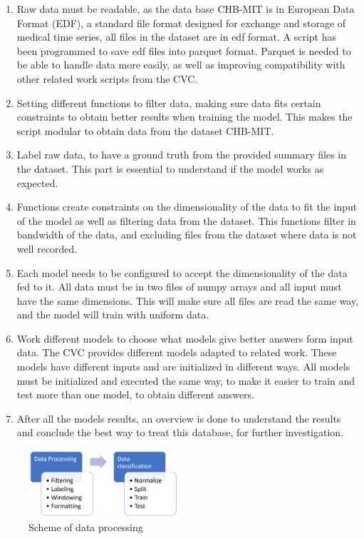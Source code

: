 \begin{enumerate}

\item Raw data must be readable, as the data base CHB-MIT is in European Data Format (EDF), a standard file format designed for exchange and storage of medical time series, all files in the dataset are in edf format. A script has been programmed to save edf files into parquet format. Parquet is needed to be able to handle data more easily, as well as improving compatibility with other related work scripts from the CVC.
\item Setting different functions to filter data, making sure data fits certain constraints to obtain better results when training the model. This makes the script modular to obtain data from the dataset CHB-MIT.
\item Label raw data, to have a ground truth from the provided summary files in the dataset.  This part is essential to understand if the model works as expected.
\item Functions create constraints on the dimensionality of the data to fit the input of the model as well as filtering data from the dataset. This functions filter in bandwidth of the data, and excluding files from the dataset where data is not well recorded.
\item Each model needs to be configured to accept the dimensionality of the data fed to it. All data must be in two files of numpy arrays and all input must have the same dimensions. This will make sure all files are read the same way, and the model will train with uniform data.
\item Work different models to choose what models give better answers form input data. The CVC provides different models adapted to related work. These models have different inputs and are initialized in different ways. All models must be initialized and executed the same way, to make it easier to train and test more than one model, to obtain different answers.
\item After all the models results, an overview is done to understand the results and conclude the best way to treat this database, for further investigation.
    
\end{enumerate}
\begin{figure}[H]
    \caption{Scheme of data processing }
    \centering
    \includegraphics[width=0.5\textwidth]{img/pipeline.png}
\end{figure}
\leavevmode\\